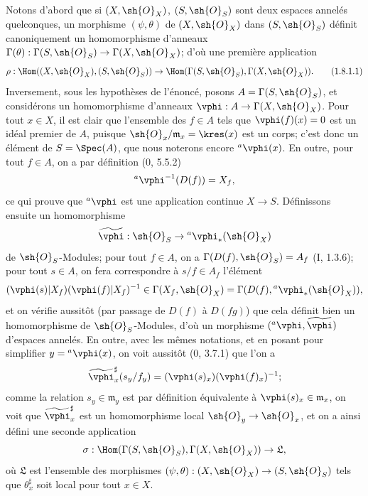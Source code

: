 Notons d'abord que si $(X,\sh{O}_X)$, $(S,\sh{O}_S)$ sont deux espaces
annelés quelconques, un morphisme $(\psi,\theta)$ de $(X,\sh{O}_X)$
dans $(S,\sh{O}_S)$ définit canoniquement un homomorphisme d'anneaux
$\Gamma(\theta):\Gamma(S,\sh{O}_S)\to\Gamma(X,\sh{O}_X)$; d'où une
première application
\begin{equation}
\label{ega2:addendum:I.1.8.1.1-fr}
  \rho:\Hom((X,\sh{O}_X),(S,\sh{O}_S))
  \to\Hom(\Gamma(S,\sh{O}_S),\Gamma(X,\sh{O}_X)).
\tag{1.8.1.1}
\end{equation}
Inversement, sous les hypothèses de l'énoncé, posons
$A=\Gamma(S,\sh{O}_S)$, et considérons un homomorphisme d'anneaux
$\vphi:A\to\Gamma(X,\sh{O}_X)$. Pour tout $x\in X$, il est clair que
l'ensemble des $f\in A$ tels que $\vphi(f)(x)=0$ est un idéal premier
de $A$, puisque $\sh{O}_x/\mathfrak m_x=\kres(x)$ est un corps; c'est
donc un élément de $S=\Spec(A)$, que nous noterons encore
${}^a\vphi(x)$. En outre, pour tout $f\in A$, on a par définition
(0, 5.5.2)
\[
  {}^a\vphi^{-1}(D(f))=X_f,
\]
ce qui prouve que ${}^a\vphi$ est une application continue $X\to S$.
Définissons ensuite un homomorphisme
\[
  \widetilde{\vphi}:\sh{O}_S\to{}^a\vphi_*(\sh{O}_X)
\]
de $\sh{O}_S$-Modules; pour tout $f\in A$, on a
$\Gamma(D(f),\sh{O}_S)=A_f$ (I, 1.3.6); pour tout $s\in A$, on fera
correspondre à $s/f\in A_f$ l'élément
\[
  (\vphi(s)|X_f)(\vphi(f)|X_f)^{-1}
  \in\Gamma(X_f,\sh{O}_X)
  =\Gamma(D(f),{}^a\vphi_*(\sh{O}_X)),
\]
et on vérifie aussitôt (par passage de $D(f)$ à $D(fg)$) que cela
définit bien un homomorphisme de $\sh{O}_S$-Modules, d'où un morphisme
$({}^a\vphi,\widetilde{\vphi})$ d'espaces annelés. En outre, avec les
mêmes notations, et en posant pour simplifier $y={}^a\vphi(x)$, on voit
aussitôt (0, 3.7.1) que l'on a
\[
  \widetilde{\vphi}_x^\sharp(s_y/f_y)
  =(\vphi(s)_x)(\vphi(f)_x)^{-1};
\]
comme la relation $s_y\in\mathfrak m_y$ est par définition équivalente
à $\vphi(s)_x\in\mathfrak m_x$, on voit que
$\widetilde{\vphi}_x^\sharp$ est un homomorphisme local
$\sh{O}_y\to\sh{O}_x$, et on a ainsi défini une seconde application
\[
  \sigma:\Hom(\Gamma(S,\sh{O}_S),\Gamma(X,\sh{O}_X))\to\mathfrak L,
\]
où $\mathfrak L$ est l'ensemble des morphismes
$(\psi,\theta):(X,\sh{O}_X)\to(S,\sh{O}_S)$ tels que
$\theta_x^\sharp$ soit local pour tout $x\in X$.

